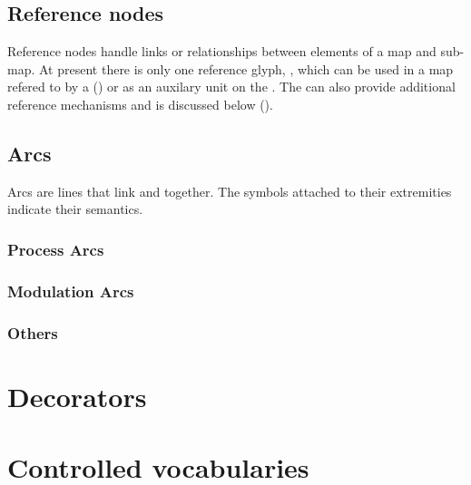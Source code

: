 



\subsection{Reference nodes}

Reference nodes handle links or relationships between elements of a
map and sub-map. At present there is only one reference glyph,
, which can be used in a map refered to by a 
() or as an auxilary unit on the . The
 can also provide additional reference mechanisms
and is discussed below ().



\subsection{Arcs}\label{sec:arcs}

Arcs are lines that link  and  together.  The symbols attached to their extremities indicate their semantics.

\subsubsection{Process Arcs}




\subsubsection{Modulation Arcs}







\subsubsection{Others}




\section{Decorators}



\section{Controlled vocabularies}\label{sec:CVs}




